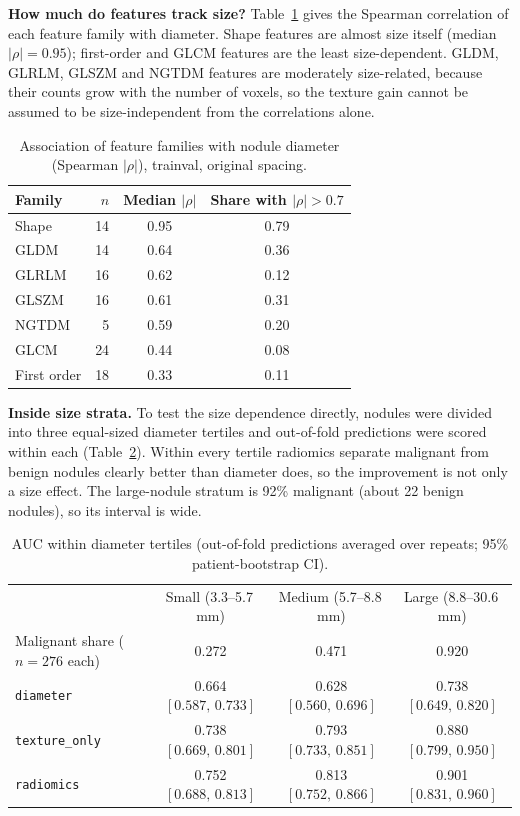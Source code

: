 \documentclass[journal]{IEEEtran}
\newcommand{\auc}{\mathrm{AUC}}
\newcommand{\ci}[2]{[#1,\,#2]}            %
\newcommand{\code}[1]{\texttt{#1}}
\begin{document}
\textbf{How much do features track size?} Table~\ref{tab:sizecorr} gives the Spearman correlation of each feature
family with diameter. Shape features are almost size itself (median $|\rho|=0.95$); first-order and GLCM features
are the least size-dependent. GLDM, GLRLM, GLSZM and NGTDM features are moderately size-related, because their
counts grow with the number of voxels, so the texture gain cannot be assumed to be size-independent from the
correlations alone.

\begin{table}[!t]
\caption{Association of feature families with nodule diameter (Spearman $|\rho|$), trainval, original spacing.}
\label{tab:sizecorr}
\centering\small
\begin{tabular}{lrcc}
\toprule
Family & $n$ & Median $|\rho|$ & Share with $|\rho|>0.7$\\
\midrule
Shape        & 14 & 0.95 & 0.79\\
GLDM         & 14 & 0.64 & 0.36\\
GLRLM        & 16 & 0.62 & 0.12\\
GLSZM        & 16 & 0.61 & 0.31\\
NGTDM        &  5 & 0.59 & 0.20\\
GLCM         & 24 & 0.44 & 0.08\\
First order  & 18 & 0.33 & 0.11\\
\bottomrule
\end{tabular}
\end{table}

\textbf{Inside size strata.} To test the size dependence directly, nodules were divided into three equal-sized
diameter tertiles and out-of-fold predictions were scored within each (Table~\ref{tab:strata}). Within every
tertile radiomics separate malignant from benign nodules clearly better than diameter does, so the improvement
is not only a size effect. The large-nodule stratum is 92\% malignant (about 22 benign nodules), so its interval is wide.

\begin{table}[!t]
\caption{$\auc$ within diameter tertiles (out-of-fold predictions averaged over repeats; 95\% patient-bootstrap CI).}
\label{tab:strata}
\centering\small
\begin{tabular}{lccc}
\toprule
 & Small (3.3--5.7\,mm) & Medium (5.7--8.8\,mm) & Large (8.8--30.6\,mm)\\
Malignant share ($n=276$ each) & 0.272 & 0.471 & 0.920\\
\midrule
\code{diameter}      & 0.664 $\ci{0.587}{0.733}$ & 0.628 $\ci{0.560}{0.696}$ & 0.738 $\ci{0.649}{0.820}$\\
\code{texture\_only} & 0.738 $\ci{0.669}{0.801}$ & 0.793 $\ci{0.733}{0.851}$ & 0.880 $\ci{0.799}{0.950}$\\
\code{radiomics}     & 0.752 $\ci{0.688}{0.813}$ & 0.813 $\ci{0.752}{0.866}$ & 0.901 $\ci{0.831}{0.960}$\\
\bottomrule
\end{tabular}
\end{table}
\end{document}
